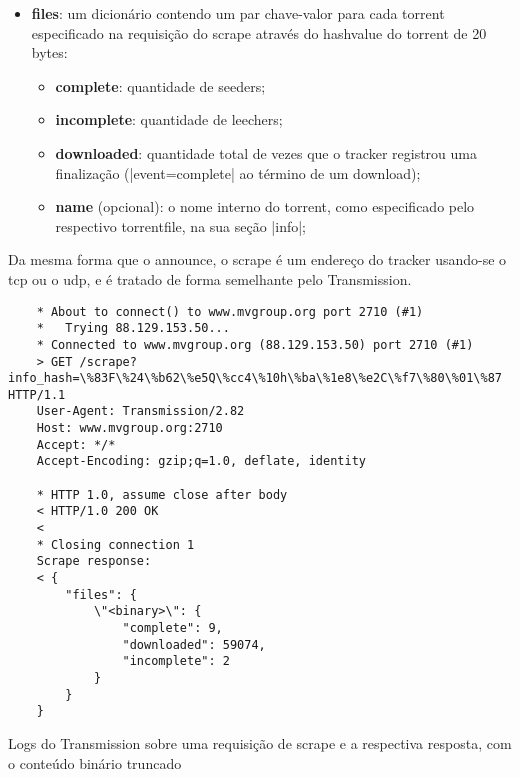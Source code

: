 \begin{itemize}
    \item \textbf{files}: um dicionário contendo um par chave-valor para cada
    \gls*{torrent} especificado na requisição do \gls*{scrape} através do
    \gls*{hashvalue} do \gls*{torrent} de 20 bytes:

    \begin{itemize}
        \item \textbf{complete}: quantidade de \glspl*{seeder};

        \item \textbf{incomplete}: quantidade de \glspl*{leecher};

        \item \textbf{downloaded}: quantidade total de vezes que o \gls*{tracker}
        registrou uma finalização (\sverb|event=complete| ao término de um download);

        \item \textbf{name} (opcional): o nome interno do \gls*{torrent}, como
        especificado pelo respectivo \gls*{torrentfile}, na sua seção \bverb|info|;
    \end{itemize}
\end{itemize}

Da mesma forma que o \gls*{announce}, o \gls*{scrape} é um endereço do \gls*{tracker}
usando-se o \gls*{tcp} ou o \gls*{udp}, e é tratado de forma semelhante pelo Transmission.


\begin{listing}[H]
    \begin{verbatim}
    * About to connect() to www.mvgroup.org port 2710 (#1)
    *   Trying 88.129.153.50...
    * Connected to www.mvgroup.org (88.129.153.50) port 2710 (#1)
    > GET /scrape?info_hash=\%83F\%24\%b62\%e5Q\%cc4\%10h\%ba\%1e8\%e2C\%f7\%80\%01\%87 HTTP/1.1
    User-Agent: Transmission/2.82
    Host: www.mvgroup.org:2710
    Accept: */*
    Accept-Encoding: gzip;q=1.0, deflate, identity

    * HTTP 1.0, assume close after body
    < HTTP/1.0 200 OK
    <
    * Closing connection 1
    Scrape response:
    < {
        "files": {
            \"<binary>\": {
                "complete": 9,
                "downloaded": 59074,
                "incomplete": 2
            }
        }
    }
    \end{verbatim}

    \caption{Logs do Transmission sobre uma requisição de scrape e a respectiva
    resposta, com o conteúdo binário truncado}
    \label{lst:scrape}
\end{listing}

